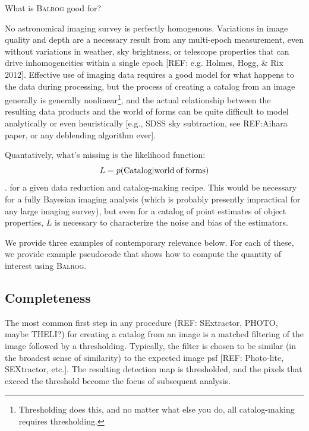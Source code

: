 \documentclass[12pt]{book}
\newcommand{\balrog}{\textsc{Balrog}}
\begin{document}
What is \balrog{} good for?

No astronomical imaging survey is perfectly homogenous. Variations in
image quality and depth are a necessary result from any multi-epoch
measurement, even without variations in weather, sky brightness, or
telescope properties that can drive inhomogeneities within a single
epoch [REF: e.g. Holmes, Hogg, \& Rix 2012]. Effective use of imaging
data requires a good model for what happens to the data during
processing, but the process of creating a catalog from an image
generally is generally nonlinear\footnote{Thresholding does this, and
  no matter what else you do, all catalog-making requires
  thresholding.}, and the actual relationship between the resulting
data products and the world of forms can be quite difficult to model
analytically or even heuristically [e.g., SDSS sky subtraction, see
REF:Aihara paper, or any deblending algorithm ever].

Quantatively, what's missing is the likelihood function:
\begin{equation}
L = p( {\rm Catalog} | {\rm world\: of\: forms})
\end{equation}.
for a given data reduction and catalog-making recipe. This would be
necessary for a fully Bayesian imaging analysis (which is probably presently impractical
for any large imaging survey), but even for a catalog of
point estimates of object properties, $L$ is necessary to characterize
the noise and bias of the estimators.

We provide three examples of contemporary relevance below. For each of
these, we provide example pseudocode that shows how to compute the
quantity of interest using \balrog{}.

\subsection{Completeness}
The most common first step in any procedure (REF: SExtractor, PHOTO, maybe THELI?) for
creating a catalog from an image is a matched filtering of the image
followed by a thresholding. Typically, the filter is chosen to be
similar (in the broadest sense of similarity) to the expected image
psf [REF: Photo-lite, SEXtractor, etc.]. The resulting detection map
is thresholded, and the pixels that exceed the threshold become the
focus of subsequent analysis.
\end{document}
